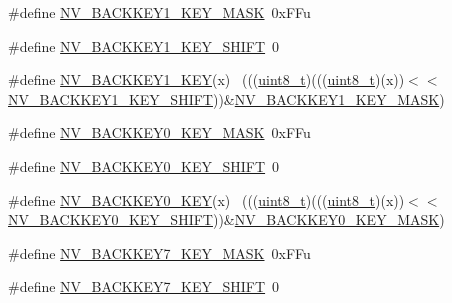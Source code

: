 \begin{DoxyCompactItemize}
\item 
\#define \hyperlink{group___n_v___register___masks_ga6cd05d78b113df7f3cb0d11d29931666}{N\+V\+\_\+\+B\+A\+C\+K\+K\+E\+Y1\+\_\+\+K\+E\+Y\+\_\+\+M\+A\+SK}~0x\+F\+Fu
\item 
\#define \hyperlink{group___n_v___register___masks_ga71418f17e11f902066ca404fbe473aef}{N\+V\+\_\+\+B\+A\+C\+K\+K\+E\+Y1\+\_\+\+K\+E\+Y\+\_\+\+S\+H\+I\+FT}~0
\item 
\#define \hyperlink{group___n_v___register___masks_gacd7a10179786650c77f0f094f6840a3c}{N\+V\+\_\+\+B\+A\+C\+K\+K\+E\+Y1\+\_\+\+K\+EY}(x)                                          ~(((\hyperlink{_p_e___types_8h_aba7bc1797add20fe3efdf37ced1182c5}{uint8\+\_\+t})(((\hyperlink{_p_e___types_8h_aba7bc1797add20fe3efdf37ced1182c5}{uint8\+\_\+t})(x))$<$$<$\hyperlink{group___n_v___register___masks_ga71418f17e11f902066ca404fbe473aef}{N\+V\+\_\+\+B\+A\+C\+K\+K\+E\+Y1\+\_\+\+K\+E\+Y\+\_\+\+S\+H\+I\+FT}))\&\hyperlink{group___n_v___register___masks_ga6cd05d78b113df7f3cb0d11d29931666}{N\+V\+\_\+\+B\+A\+C\+K\+K\+E\+Y1\+\_\+\+K\+E\+Y\+\_\+\+M\+A\+SK})
\item 
\#define \hyperlink{group___n_v___register___masks_gafa0e31ca33d445d47d2fd89785e4ec9b}{N\+V\+\_\+\+B\+A\+C\+K\+K\+E\+Y0\+\_\+\+K\+E\+Y\+\_\+\+M\+A\+SK}~0x\+F\+Fu
\item 
\#define \hyperlink{group___n_v___register___masks_ga381e2b0a778da31fa6c795550e71aed8}{N\+V\+\_\+\+B\+A\+C\+K\+K\+E\+Y0\+\_\+\+K\+E\+Y\+\_\+\+S\+H\+I\+FT}~0
\item 
\#define \hyperlink{group___n_v___register___masks_ga119a9432df0049c7606825aee3a20f31}{N\+V\+\_\+\+B\+A\+C\+K\+K\+E\+Y0\+\_\+\+K\+EY}(x)                                          ~(((\hyperlink{_p_e___types_8h_aba7bc1797add20fe3efdf37ced1182c5}{uint8\+\_\+t})(((\hyperlink{_p_e___types_8h_aba7bc1797add20fe3efdf37ced1182c5}{uint8\+\_\+t})(x))$<$$<$\hyperlink{group___n_v___register___masks_ga381e2b0a778da31fa6c795550e71aed8}{N\+V\+\_\+\+B\+A\+C\+K\+K\+E\+Y0\+\_\+\+K\+E\+Y\+\_\+\+S\+H\+I\+FT}))\&\hyperlink{group___n_v___register___masks_gafa0e31ca33d445d47d2fd89785e4ec9b}{N\+V\+\_\+\+B\+A\+C\+K\+K\+E\+Y0\+\_\+\+K\+E\+Y\+\_\+\+M\+A\+SK})
\item 
\#define \hyperlink{group___n_v___register___masks_gac3f2bc7dd55b7951d70a5d1fcb6552b8}{N\+V\+\_\+\+B\+A\+C\+K\+K\+E\+Y7\+\_\+\+K\+E\+Y\+\_\+\+M\+A\+SK}~0x\+F\+Fu
\item 
\#define \hyperlink{group___n_v___register___masks_gad6bef74e61e792dfa5b7d195e4ce5620}{N\+V\+\_\+\+B\+A\+C\+K\+K\+E\+Y7\+\_\+\+K\+E\+Y\+\_\+\+S\+H\+I\+FT}~0

\end{DoxyCompactItemize}
